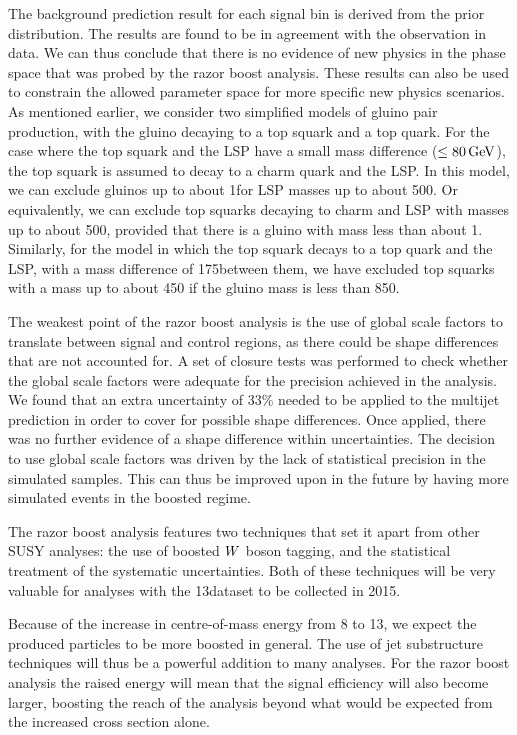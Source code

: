 The background prediction result for each signal bin is derived from the prior distribution. 
The results are found to be in agreement with the observation in data. We can thus conclude that
there is no evidence of new physics in the phase space that was probed by the razor boost analysis. 
These results can also be used to constrain the allowed parameter space for more specific new
physics scenarios. As mentioned earlier, we consider two simplified models of gluino pair
production, with the gluino decaying to a top squark and a top quark. For the case where the top
squark and the LSP have a small mass difference ($\leq 80\,\text{Ge\hspace{-.08em}V}$), the top squark is assumed to decay
to a charm quark and the LSP. In this model, we can exclude gluinos up to about 1\TeV for LSP masses
up to about 500\GeV. Or equivalently, we can exclude top squarks decaying to charm and LSP with
masses up to about 500\GeV, provided that there is a gluino with mass less than about 1\TeV. 
Similarly, for the model in which the top squark decays to a top quark and the LSP, with a mass
difference of 175\GeV between them, we have excluded top squarks with a mass up to about 450\GeV
if the gluino mass is less than 850\GeV.


The weakest point of the razor boost analysis is the use of global scale factors to translate
between signal and control regions, as there could be shape differences that are not accounted for.
A set of closure tests was performed to check whether the global scale factors were adequate for
the precision achieved in the analysis. We found that an extra uncertainty of 33\% needed to be
applied to the multijet prediction in order to cover for possible shape differences. 
Once applied, there was no further evidence of a shape difference within uncertainties. 
The decision to use global scale factors was driven by the lack of statistical precision
in the simulated samples. This can thus be improved upon in the future by having more simulated
events in the boosted regime. 


The razor boost analysis features two techniques that set it apart from other SUSY analyses: the
use of boosted $W$ boson tagging, and the statistical treatment of the systematic uncertainties. 
Both of these techniques will be very valuable for analyses with the 13\TeV dataset to be
collected in 2015. 


Because of the increase in centre-of-mass energy from 8 to 13\TeV, we expect the produced particles
to be more boosted in general. The use of jet substructure techniques will thus be a powerful
addition to many analyses. For the razor boost analysis the raised energy will mean that the
signal efficiency will also become larger, boosting the reach of the analysis beyond what would be
expected from the increased cross section alone. 


